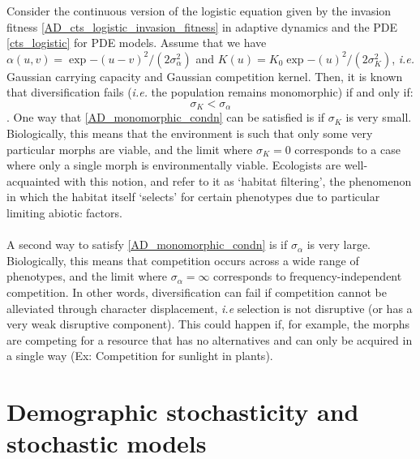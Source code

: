 Consider the continuous version of the logistic equation given by the invasion fitness \eqref{AD_cts_logistic_invasion_fitness} in adaptive dynamics and the PDE \eqref{cts_logistic} for PDE models. Assume that we have $\alpha(u,v) = \exp{-(u-v)^2/(2\sigma^{2}_{\alpha})}$ and $K(u) = K_{0}\exp{-(u)^2/(2\sigma^{2}_{K})}$, \emph{i.e.} Gaussian carrying capacity and Gaussian competition kernel. Then, it is known that diversification fails (\emph{i.e.} the population remains monomorphic) if and only if:
\begin{equation}\label{AD_monomorphic_condn}
\sigma_K<\sigma_{\alpha}
\end{equation}.
One way that \ref{AD_monomorphic_condn} can be satisfied is if $\sigma_K$ is very small. Biologically, this means that the environment is such that only some very particular morphs are viable, and the limit where $\sigma_K = 0$ corresponds to a case where only a single morph is environmentally viable. Ecologists are well-acquainted with this notion, and refer to it as `habitat filtering', the phenomenon in which the habitat itself `selects' for certain phenotypes due to particular limiting abiotic factors.\\
\\
A second way to satisfy \ref{AD_monomorphic_condn} is if $\sigma_{\alpha}$ is very large. Biologically, this means that competition occurs across a wide range of phenotypes, and the limit where $\sigma_{\alpha} = \infty$ corresponds to frequency-independent competition. In other words, diversification can fail if competition cannot be alleviated through character displacement, \emph{i.e} selection is not disruptive (or has a very weak disruptive component). This could happen if, for example, the morphs are competing for a resource that has no alternatives and can only be acquired in a single way (Ex: Competition for sunlight in plants).

\section{Demographic stochasticity and stochastic models}\label{dem_stoch}

